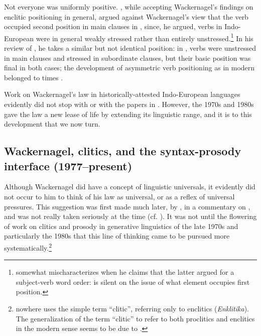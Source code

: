 \documentclass[output=paper]{../langscibook}
\begin{document}
Not everyone was uniformly positive. \citet[81--83]{Delbrueck1900}, while accepting Wackernagel's findings on enclitic positioning in general, argued against Wackernagel's view that the verb occupied second position in main clauses in , since, he argued, verbs in Indo-European were in general weakly stressed rather than entirely unstressed.\footnote{\citet[81]{Delbrueck1900} somewhat mischaracterizes \citet{Wackernagel1892} when he claims that the latter argued for a subject-verb word order: \citet{Wackernagel1892} is silent on the issue of what element occupies first position.} In his review of \citet{Ries1907}, he takes a similar but not identical position: in , verbs were unstressed in main clauses and stressed in subordinate clauses, but their basic position was final in both cases; the development of asymmetric verb positioning as in modern  belonged to  times \citep[75--76]{Delbrueck1907}.

Work on Wackernagel's law in historically-attested Indo-European languages evidently did not stop with \citet{Watkins1964} or with the papers in \citet{EichnerRix1990}. However, the 1970s and 1980s gave the law a new lease of life by extending its linguistic range, and it is to this development that we now turn.

\subsection{Wackernagel, clitics, and the syntax-prosody interface (1977--present)}

Although Wackernagel did have a concept of linguistic universals, it evidently did not occur to him to think of his law as universal, or as a reflex of universal pressures. This suggestion was first made much later, by \citet[613]{Kurylowicz1958}, in a commentary on \citet{Ivanov1958}, and was not really taken seriously at the time (cf. \citealp[1036]{Watkins1964}). It was not until the flowering of work on clitics and prosody in generative linguistics of the late 1970s and particularly the 1980s that this line of thinking came to be pursued more systematically.\footnote{\citet{Wackernagel1892} nowhere uses the simple term ``clitic'', referring only to enclitics (\textit{Enklitika}). The generalization of the term ``clitic'' to refer to both proclitics and enclitics in the modern sense seems to be due to \citet[155]{Nida1946} \citep{Haspelmath2015}.}
\end{document}
